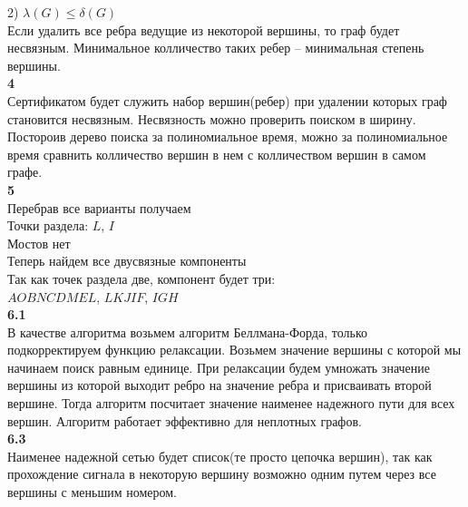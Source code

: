 \documentclass[a4paper,12pt]{article}
\begin{document}
2) $\lambda(G) \leq \delta(G)$\\
Если удалить все ребра ведущие из некоторой вершины, то граф будет несвязным. Минимальное колличество таких ребер -- минимальная степень вершины.\\
\large\textbf{4}\normalsize\\
Сертификатом будет служить набор вершин(ребер) при удалении которых граф становится несвязным. Несвязность можно проверить поиском в ширину. Постороив дерево поиска за полиномиальное время, можно за полиномиальное время сравнить колличество вершин в нем с колличеством вершин в самом графе.\\
\large\textbf{5}\normalsize\\
Перебрав все варианты получаем\\
Точки раздела: $L$, $I$\\
Мостов нет\\
Теперь найдем все двусвязные компоненты\\
Так как точек раздела две, компонент будет три:\\
$AOBNCDMEL$, $LKJIF$, $IGH$\\ 
\large\textbf{6.1}\normalsize\\
В качестве алгоритма возьмем алгоритм Беллмана-Форда, только подкорректируем функцию релаксации. Возьмем значение вершины с которой мы начинаем поиск равным единице. При релаксации будем умножать значение вершины из которой выходит ребро на значение ребра и присваивать второй вершине. Тогда алгоритм посчитает значение наименее надежного пути для всех вершин. Алгоритм работает эффективно для неплотных графов.\\  
\large\textbf{6.3}\normalsize\\
Наименее надежной сетью будет список(те просто цепочка вершин), так как прохождение сигнала в некоторую вершину возможно одним путем через все вершины с меньшим номером.\\
\end{document}
